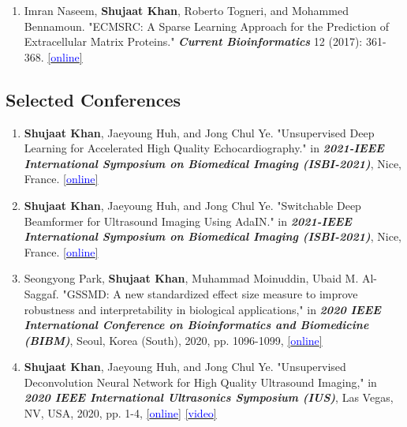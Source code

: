 \begin{enumerate}
    \item Imran Naseem, \textbf{Shujaat Khan}, Roberto Togneri, and Mohammed Bennamoun. "ECMSRC: A Sparse Learning Approach for the Prediction of Extracellular Matrix Proteins." \textit{\textbf{Current Bioinformatics}} 12 (2017): 361-368. \href{https://doi.org/10.2174/1574893611666151215213508}{[\textcolor{blue}{online}]}
\end{enumerate}

\subsection*{Selected Conferences}
\begin{enumerate}
    \item \textbf{Shujaat Khan}, Jaeyoung Huh, and Jong Chul Ye. "Unsupervised Deep Learning for Accelerated High Quality Echocardiography." in  \textit{\textbf{2021-IEEE International Symposium on Biomedical Imaging (ISBI-2021)}}, Nice, France. \href{https://ieeexplore.ieee.org/document/9433770}{[\textcolor{blue}{online}]}
    
    \item \textbf{Shujaat Khan}, Jaeyoung Huh, and Jong Chul Ye. "Switchable Deep Beamformer for Ultrasound Imaging Using AdaIN." in  \textit{\textbf{2021-IEEE International Symposium on Biomedical Imaging (ISBI-2021)}}, Nice, France. \href{https://ieeexplore.ieee.org/document/9433757}{[\textcolor{blue}{online}]}

    \item Seongyong Park, \textbf{Shujaat Khan}, Muhammad Moinuddin, Ubaid M. Al-Saggaf. "GSSMD: A new standardized effect size measure to improve robustness and interpretability in biological applications," in  \textit{\textbf{2020 IEEE International Conference on Bioinformatics and Biomedicine (BIBM)}}, Seoul, Korea (South), 2020, pp. 1096-1099, \href{https://ieeexplore.ieee.org/document/9313582}{[\textcolor{blue}{online}]}
    
    \item \textbf{Shujaat Khan}, Jaeyoung Huh, and Jong Chul Ye. "Unsupervised Deconvolution Neural Network for High Quality Ultrasound Imaging," in  \textit{\textbf{2020 IEEE International Ultrasonics Symposium (IUS)}}, Las Vegas, NV, USA, 2020, pp. 1-4, \href{https://doi.org/10.1109/IUS46767.2020.9251418}{[\textcolor{blue}{online}]} \href{https://youtu.be/L_iEO24Vvrw}{[\textcolor{blue}{video}]}
    


\end{enumerate}
